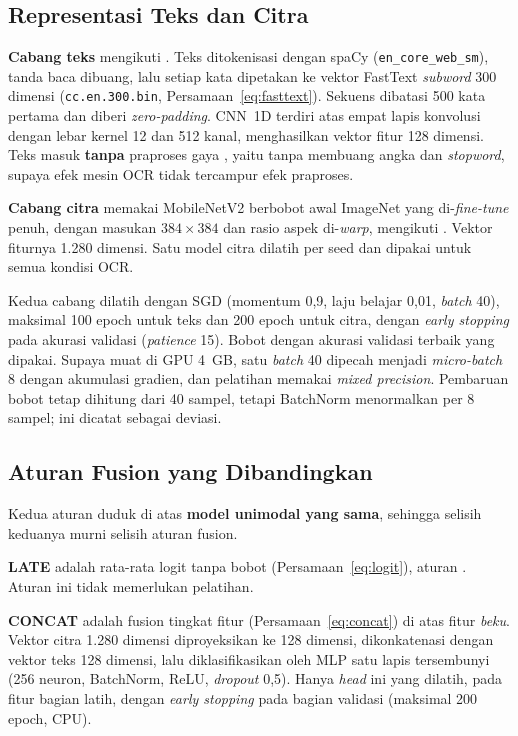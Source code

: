 \subsection{Representasi Teks dan Citra}\label{sec:representasi}

\textbf{Cabang teks} mengikuti \textcite{audebert2020}. Teks ditokenisasi dengan spaCy
(\texttt{en\_core\_web\_sm}), tanda baca dibuang, lalu setiap kata dipetakan ke vektor
FastText \textit{subword} 300 dimensi (\texttt{cc.en.300.bin},
Persamaan~\ref{eq:fasttext}). Sekuens dibatasi 500 kata pertama dan diberi
\textit{zero-padding}. CNN~1D terdiri atas empat lapis konvolusi dengan lebar kernel 12
dan 512 kanal, menghasilkan vektor fitur 128 dimensi. Teks masuk \textbf{tanpa} praproses
gaya \textcite{kashyap2026}, yaitu tanpa membuang angka dan \textit{stopword}, supaya efek
mesin OCR tidak tercampur efek praproses.

\textbf{Cabang citra} memakai MobileNetV2 berbobot awal ImageNet yang di-\textit{fine-tune}
penuh, dengan masukan $384\times384$ dan rasio aspek di-\textit{warp}, mengikuti
\textcite{audebert2020}. Vektor fiturnya 1.280 dimensi. Satu model citra dilatih per seed
dan dipakai untuk semua kondisi OCR.

Kedua cabang dilatih dengan SGD (momentum 0,9, laju belajar 0,01, \textit{batch} 40),
maksimal 100 epoch untuk teks dan 200 epoch untuk citra, dengan \textit{early stopping}
pada akurasi validasi (\textit{patience} 15). Bobot dengan akurasi validasi terbaik yang
dipakai. Supaya muat di GPU 4~GB, satu \textit{batch} 40 dipecah menjadi
\textit{micro-batch} 8 dengan akumulasi gradien, dan pelatihan memakai \textit{mixed
precision}. Pembaruan bobot tetap dihitung dari 40 sampel, tetapi BatchNorm menormalkan
per 8 sampel; ini dicatat sebagai deviasi.

\subsection{Aturan Fusion yang Dibandingkan}\label{sec:fusion}

Kedua aturan duduk di atas \textbf{model unimodal yang sama}, sehingga selisih keduanya
murni selisih aturan fusion.

\textbf{LATE} adalah rata-rata logit tanpa bobot (Persamaan~\ref{eq:logit}), aturan
\textcite{kashyap2026}. Aturan ini tidak memerlukan pelatihan.

\textbf{CONCAT} adalah fusion tingkat fitur (Persamaan~\ref{eq:concat}) di atas fitur
\emph{beku}. Vektor citra 1.280 dimensi diproyeksikan ke 128 dimensi, dikonkatenasi dengan
vektor teks 128 dimensi, lalu diklasifikasikan oleh MLP satu lapis tersembunyi (256
neuron, BatchNorm, ReLU, \textit{dropout} 0,5). Hanya \textit{head} ini yang dilatih, pada
fitur bagian latih, dengan \textit{early stopping} pada bagian validasi (maksimal 200
epoch, CPU).


